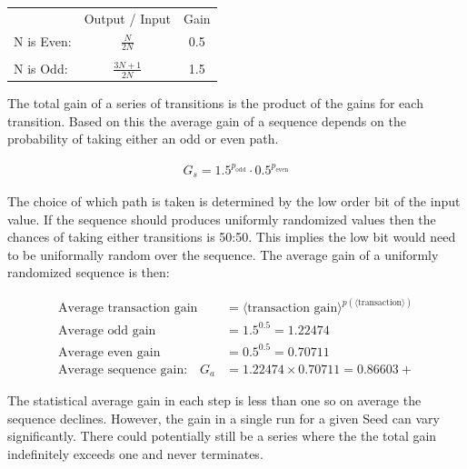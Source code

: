 \documentclass[letterpaper]{article}
\begin{document}
\begin{multicols}{2}
    \begin{center}
        \begin{tabular}{l c c}
                       & Output / Input      & Gain \\
            N is Even: & $\frac{N}{2N}$      & 0.5  \\
                       &                     &      \\
            N is Odd:  & $\frac{3N + 1}{2N}$ & 1.5
        \end{tabular}
    \end{center}

    The total gain of a series of transitions is the product of the gains for each transition. Based on this the average gain of a sequence depends on the probability of taking either an odd or even path.

    \begin{align*}
        G_s = 1.5^{p_{\text{odd}}} \cdot 0.5^{p_{\text{even}}}
    \end{align*}

    The choice of which path is taken is determined by the low order bit of the input value. If the sequence should produces uniformly randomized values then the chances of taking either transitions is 50:50. This implies the low bit would need to be uniformally random over the sequence. The average gain of a uniformly randomized sequence is then:

    \begin{align*}
        \text{Average transaction gain}         & = \langle \text{transaction gain} \rangle^{p(\langle \text{transaction} \rangle)} \\
        \text{Average odd gain}                 & = 1.5^{0.5} = 1.22474                                                             \\
        \text{Average even gain}                & = 0.5^{0.5} = 0.70711                                                             \\
        \text{Average sequence gain:} \quad G_a & = 1.22474 \times 0.70711 = 0.86603+
    \end{align*}

    The statistical average gain in each step is less than one so on average the sequence declines. However, the gain in a single run for a given Seed can vary significantly. There could potentially still be a series where the the total gain indefinitely exceeds one and never terminates.


\end{multicols}
\end{document}

